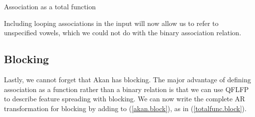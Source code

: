 \documentclass[,doc,floatsintext]{apa6}
\theoremstyle{definition}
\theoremstyle{definition}
\theoremstyle{definition}
\theoremstyle{remark}
\begin{document}
\newpage

\begin{exe}
\ex \label{total.func} Association as a total function \\
\end{exe}

\noindent Including looping associations in the input will now allow us
to refer to unspecified vowels, which we could not do with the binary
association relation.

\subsection{Blocking}\label{blocking-1}

Lastly, we cannot forget that Akan has blocking. The major advantage of
defining association as a function rather than a binary relation is that
we can use QFLFP to describe feature spreading with blocking. We can now
write the complete AR transformation for blocking by adding to
(\ref{akan.block}), as in (\ref{totalfunc.block}).
\end{document}
